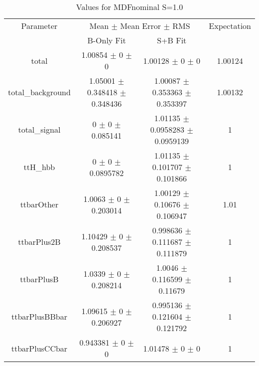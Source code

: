 \begin{table}
\centering
\caption{Values for MDFnominal S=1.0}
\begin{tabular}{cccc}
\toprule
Parameter & \multicolumn{2}{c}{Mean $\pm$ Mean Error $\pm$ RMS} & Expectation\\
 & B-Only Fit & S+B Fit & \\
\midrule
total & \num{1.00854} $\pm$ \num{0} $\pm$ \num{0} & \num{1.00128} $\pm$ \num{0} $\pm$ \num{0} & \num{1.00124}\\
total\_background & \num{1.05001} $\pm$ \num{0.348418} $\pm$ \num{0.348436} & \num{1.00087} $\pm$ \num{0.353363} $\pm$ \num{0.353397} & \num{1.00132}\\
total\_signal & \num{0} $\pm$ \num{0} $\pm$ \num{0.085141} & \num{1.01135} $\pm$ \num{0.0958283} $\pm$ \num{0.0959139} & \num{1}\\
ttH\_hbb & \num{0} $\pm$ \num{0} $\pm$ \num{0.0895782} & \num{1.01135} $\pm$ \num{0.101707} $\pm$ \num{0.101866} & \num{1}\\
ttbarOther & \num{1.0063} $\pm$ \num{0} $\pm$ \num{0.203014} & \num{1.00129} $\pm$ \num{0.10676} $\pm$ \num{0.106947} & \num{1.01}\\
ttbarPlus2B & \num{1.10429} $\pm$ \num{0} $\pm$ \num{0.208537} & \num{0.998636} $\pm$ \num{0.111687} $\pm$ \num{0.111879} & \num{1}\\
ttbarPlusB & \num{1.0339} $\pm$ \num{0} $\pm$ \num{0.208214} & \num{1.0046} $\pm$ \num{0.116599} $\pm$ \num{0.11679} & \num{1}\\
ttbarPlusBBbar & \num{1.09615} $\pm$ \num{0} $\pm$ \num{0.206927} & \num{0.995136} $\pm$ \num{0.121604} $\pm$ \num{0.121792} & \num{1}\\
ttbarPlusCCbar & \num{0.943381} $\pm$ \num{0} $\pm$ \num{0} & \num{1.01478} $\pm$ \num{0} $\pm$ \num{0} & \num{1}\\
\bottomrule
\end{tabular}
\end{table}